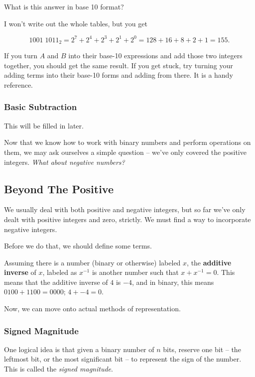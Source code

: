 \documentclass[12pt]{article}
\begin{document}
    What is this answer in base 10 format?

    I won't write out the whole tables, but
    you get

    \[1001 \; 1011_2 = 2^7 + 2^4 + 2^3 + 2^1 + 2^0 = 128 + 16 + 8 + 2 + 1 = 155. \]

    If you turn $A$ and $B$ into their base-10 expressions and add those two integers together,
    you should get the same result. If you get stuck, try turning your adding terms into
    their base-10 forms and adding from there. It is a handy reference.

    \subsubsection{Basic Subtraction}
    This will be filled in later.



    Now that we know how to work with binary numbers and perform operations on them,
    we may ask ourselves a simple question -- we've only covered the positive integers. \textit{What about negative
    numbers?}



  \subsection{Beyond The Positive}
  We usually deal with both positive and negative integers, but so far we've only dealt with positive integers
  and zero, strictly. We must find a way to incorporate negative integers.

  Before we do that, we should define some terms.

  Assuming there is a number (binary or otherwise) labeled $x$, the \textbf{additive inverse} of $x$, labeled as $x^{-1}$
  is another number such that $x + x^{-1} = 0$. This means that the additive inverse of $4$ is $-4$, and in binary, this
  means $0100 + 1100 = 0000$; $4 + -4 = 0$.

  Now, we can move onto actual methods of representation.
  
  \subsubsection{Signed Magnitude}
  
  One logical idea is that given a binary number of $n$ bits, reserve one bit -- the leftmost bit,
  or the most significant bit -- to represent the sign
  of the number. This is called the \textit{signed magnitude}.
\end{document}
